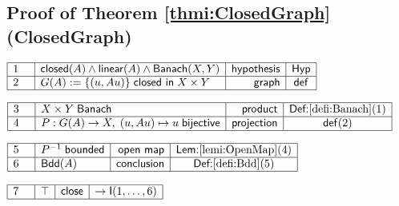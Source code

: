 \documentclass[11pt,reqno]{amsart}
\begin{document}
	\subsection*{Proof of Theorem \protect\ref{thmi:ClosedGraph} (\textsf{ClosedGraph})}
	\noindent$\begin{array}{|m{0.5cm}|l|r|c|}
	\hline
	1 & \mathsf{closed}(A)\wedge\mathsf{linear}(A)\wedge\mathsf{Banach}(X,Y) & \mathsf{hypothesis} & \mathsf{Hyp} \\ \hline
	2 & G(A):=\{(u,Au)\}\;\mathsf{closed\ in}\;X\times Y & \mathsf{graph} & \mathsf{def} \\ \hline
	\end{array}$
	\par\nointerlineskip\noindent$\begin{array}{|m{0.5cm}|l|r|c|}
	\hline
	3 & X\times Y\;\mathsf{Banach} & \mathsf{product} & \textsf{Def:}\ref{defi:Banach}(1) \\ \hline
	4 & P:G(A)\to X,\;(u,Au)\mapsto u\;\mathsf{bijective} & \mathsf{projection} & \mathsf{def}(2) \\ \hline
	\end{array}$
	\par\nointerlineskip\noindent$\begin{array}{|m{0.5cm}|l|r|c|}
	\hline
	5 & P^{-1}\;\mathsf{bounded} & \mathsf{open\ map} & \textsf{Lem:}\ref{lemi:OpenMap}(4) \\ \hline
	6 & \mathsf{Bdd}(A) & \mathsf{conclusion} & \textsf{Def:}\ref{defi:Bdd}(5) \\ \hline
	\end{array}$
	\par\nointerlineskip\noindent$\begin{array}{|m{0.5cm}|l|r|c|}
	\hline
	7 & \top & \mathsf{close} & \to\mathsf{I}(1,\dots,6) \\ \hline
	\end{array}$
	\medskip
	
\end{document}
